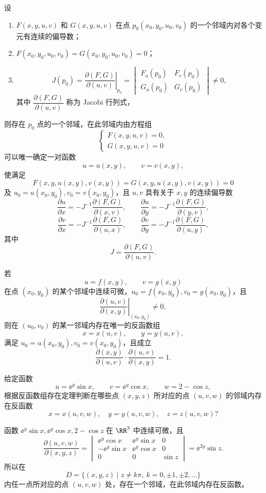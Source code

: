 \begin{xproposition}[20.2.1（隐函数组存在定理）]
设
\begin{enumerate}[label=(\arabic*)]
  \item $F(x,y,u,v)$ 和 $G(x,y,u,v)$ 在点 $p_0(x_0,y_0,u_0,v_0)$ 的一个邻域内对各个变元有连续的偏导数；
  \item $F(x_0,y_0,u_0,v_0)=G(x_0,y_0,u_0,v_0)=0$；
  \item
  \[
    J(p_0)=\left.\frac{\partial(F,G)}{\partial(u,v)}\right|_{p_0}
    =\begin{vmatrix}
      F_u(p_0)&F_v(p_0)\\
      G_u(p_0)&G_v(p_0)
    \end{vmatrix}\ne0,
  \]
  其中 $\dfrac{\partial(F,G)}{\partial(u,v)}$ 称为 Jacobi 行列式，
\end{enumerate}
则存在 $p_0$ 点的一个邻域，在此邻域内由方程组
\[
  \begin{cases}
    F(x,y,u,v)=0,\\
    G(x,y,u,v)=0
  \end{cases}
\]
可以唯一确定一对函数
\[
  u=u(x,y),\qquad v=v(x,y),
\]
使满足
\[
  F(x,y,u(x,y),v(x,y))=G(x,y,u(x,y),v(x,y))=0
\]
及 $u_0=u(x_0,y_0),v_0=v(x_0,y_0)$，且 $u,v$ 具有关于 $x,y$ 的连续偏导数
\[
  \frac{\partial u}{\partial x}=-J^{-1}\frac{\partial(F,G)}{\partial(x,v)},
  \qquad
  \frac{\partial u}{\partial y}=-J^{-1}\frac{\partial(F,G)}{\partial(y,v)},
\]
\[
  \frac{\partial v}{\partial x}=-J^{-1}\frac{\partial(F,G)}{\partial(u,x)},
  \qquad
  \frac{\partial v}{\partial y}=-J^{-1}\frac{\partial(F,G)}{\partial(u,y)},
\]
其中
\[
  J=\frac{\partial(F,G)}{\partial(u,v)}.
\]
\end{xproposition}

\begin{xproposition}[20.2.2（反函数组存在定理）]
若
\[
  u=f(x,y),\qquad v=g(x,y)
\]
在点 $(x_0,y_0)$ 的某个邻域中连续可微，$u_0=f(x_0,y_0),v_0=g(x_0,y_0)$，且
\[
  \left.\frac{\partial(u,v)}{\partial(x,y)}\right|_{(x_0,y_0)}\ne0,
\]
则在 $(u_0,v_0)$ 的某一邻域内存在唯一的反函数组
\[
  x=x(u,v),\qquad y=y(u,v),
\]
满足 $u_0=u(x_0,y_0),v_0=v(x_0,y_0)$，且成立
\[
  \frac{\partial(x,y)}{\partial(u,v)}\cdot
  \frac{\partial(u,v)}{\partial(x,y)}=1.
\]
\end{xproposition}

\begin{xexample}[20.2.1]
给定函数
\[
  u=\ee^y\sin x,\qquad v=\ee^y\cos x,\qquad w=2-\cos z,
\]
根据反函数组存在定理判断在哪些点 $(x,y,z)$ 所对应的点 $(u,v,w)$ 的邻域内存在反函数
\[
  x=x(u,v,w),\quad y=y(u,v,w),\quad z=z(u,v,w)?
\]
\end{xexample}
\begin{xsolution}
函数 $\ee^y\sin x,\ee^y\cos x,2-\cos z$ 在 $\RR^3$ 中连续可微，且
\[
  \frac{\partial(u,v,w)}{\partial(x,y,z)}
  =\begin{vmatrix}
    \ee^y\cos x&\ee^y\sin x&0\\
    -\ee^y\sin x&\ee^y\cos x&0\\
    0&0&\sin z
  \end{vmatrix}
  =\ee^{2y}\sin z.
\]
所以在
\[
  D=\{(x,y,z)\mid z\ne k\pi,\ k=0,\pm1,\pm2,\ldots\}
\]
内任一点所对应的点 $(u,v,w)$ 处，存在一个邻域，在此邻域内存在反函数。
\end{xsolution}

